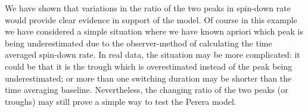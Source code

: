We have shown that variations in the ratio of the two peaks in spin-down rate
would provide clear evidence in support of the \citet{Perera2014} model. Of
course in this example we have considered a simple situation where we have
known apriori which peak is being underestimated due to the observer-method of
calculating the time averaged spin-down rate. In real data, the situation may
be more complicated: it could be that it is the trough which is overestimated
instead of the peak being underestimated; or more than one switching duration
may be shorter than the time averaging baseline.  Nevertheless, the changing
ratio of the two peaks (or troughs) may still prove a simple way to test the
Perera model.

%
%
%
%
